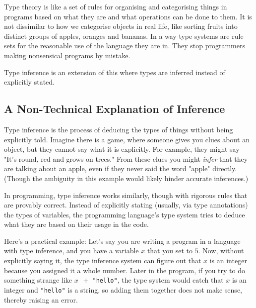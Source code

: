 \documentclass{l4proj}
\begin{document}
Type theory is like a set of rules for organising and categorising things in programs based on what they are and what operations can be done to them.
It is not dissimilar to how we categorise objects in real life, like sorting fruits into distinct groups of apples, oranges and bananas. In a way type systems are rule sets for the reasonable use of the language they are in.
They stop programmers making nonsensical programs by mistake.


Type inference is an extension of this where types are inferred instead of explicitly stated.

\subsection{A Non-Technical Explanation of Inference}
\label{sec:non-technical-inference-explanation}

Type inference is the process of deducing the types of things without being explicitly told.
Imagine there is a game, where someone gives you clues about an object, but they cannot say what it is explicitly.
For example, they might say "It's round, red and grows on trees."
From these clues you might \emph{infer} that they are talking about an apple, even if they never said the word "apple" directly. 
(Though the ambiguity in this example would likely hinder accurate inferences.)

In programming, type inference works similarly, though with rigorous rules that are provably correct.
Instead of explicitly stating (usually, via type annotations) the types of variables, the programming language's type system tries to deduce what they are based on their usage in the code.


Here's a practical example: Let's say you are writing a program in a language with type inference, and you have a variable $x$ that you set to $5$.
Now, without explicitly saying it, the type inference system can figure out that $x$ is an integer because you assigned it a whole number.
Later in the program, if you try to do something strange like $x \;\: +$ \texttt{"hello"}, the type system would catch that $x$ is an integer and \texttt{"hello"} is a string, so adding them together does not make sense, thereby raising an error.
\end{document}
